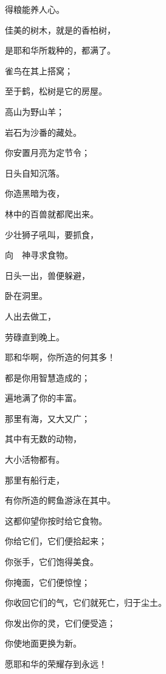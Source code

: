 {\par }{\Q 得粮能养人心。
\par }{\Q {}佳美的树木，就是{}的香柏树，
\par }{\Q 是耶和华所栽种的，都满了{}。
\par }{\Q {}雀鸟在其上搭窝；
\par }{\Q 至于鹤，松树是它的房屋。
\par }{\Q {}高山为野山羊{}；
\par }{\Q 岩石为沙番的藏处。
\par }{\Q {}你安置月亮为定节令；
\par }{\Q 日头自知沉落。
\par }{\Q {}你造黑暗为夜，
\par }{\Q 林中的百兽就都爬出来。
\par }{\Q {}少壮狮子吼叫，要抓食，
\par }{\Q 向　神寻求食物。
\par }{\Q {}日头一出，兽便躲避，
\par }{\Q 卧在洞里。
\par }{\Q {}人出去做工，
\par }{\Q 劳碌直到晚上。
\par }{\BB \par }{\Q {}耶和华啊，你所造的何其多！
\par }{\Q 都是你用智慧造成的；
\par }{\Q 遍地满了你的丰富。
\par }{\Q {}那里有海，又大又广；
\par }{\Q 其中有无数的动物，
\par }{\Q 大小活物都有。
\par }{\Q {}那里有船行走，
\par }{\Q 有你所造的鳄鱼游泳在其中。
\par }{\BB \par }{\Q {}这都仰望你按时给它食物。
\par }{\Q {}你给它们，它们便拾起来；
\par }{\Q 你张手，它们饱得美食。
\par }{\Q {}你掩面，它们便惊惶；
\par }{\Q 你收回它们的气，它们就死亡，归于尘土。
\par }{\Q {}你发出你的灵，它们便受造；
\par }{\Q 你使地面更换为新。
\par }{\BB \par }{\Q {}愿耶和华的荣耀存到永远！
}
